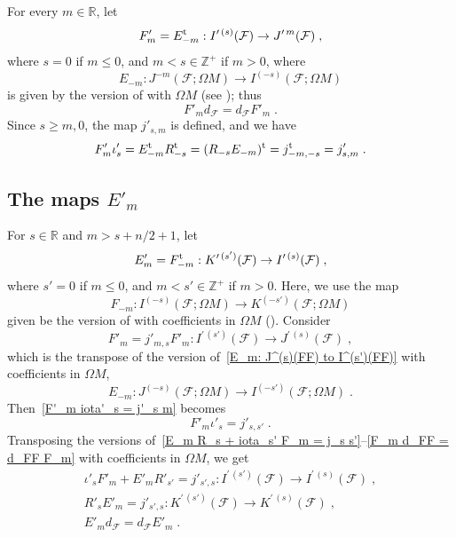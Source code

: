\documentclass{memo-l}
\theoremstyle{plain}
\theoremstyle{definition}
\theoremstyle{remark}
\newcommand{\R}{\mathbb{R}}
\newcommand{\Z}{\mathbb{Z}}
\newcommand{\FF}{\mathcal{F}}
\newcommand{\trans}{{\text{\rm t}}}
\numberwithin{section}{chapter}
\numberwithin{equation}{section}%
\begin{document}
For every $m\in\R$, let 
\[
F'_m=E_{-m}^\trans:I^{\prime\,(s)}(\FF)\to J^{\prime\,m}(\FF)\;,
\]
where $s=0$ if $m\le0$, and $m<s\in\Z^+$ if $m>0$, where
\[
E_{-m}:J^{-m}(\FF;\Omega M)\to I^{(-s)}(\FF;\Omega M)
\]
is given by the version of  with $\Omega M$ (see ); thus
\begin{equation}\label{F'_m d_FF = d_FF F'_m}
F'_md_\FF=d_\FF F'_m\;.
\end{equation}
Since $s\ge m,0$, the map $j'_{s,m}$ is defined, and we have
\begin{equation}\label{F'_m iota'_s = j'_s m}
F'_m\iota'_s=E_{-m}^\trans R_{-s}^\trans=(R_{-s}E_{-m})^\trans=j_{-m,-s}^\trans=j'_{s,m}\;.
\end{equation}




\subsection{The maps $E'_m$}\label{ss: E'_m}

For $s\in\R$ and $m>s+n/2+1$, let 
\[
E'_m=F_{-m}^\trans:K^{\prime\,(s')}(\FF)\to I^{\prime\,(s)}(\FF)\;,
\]
where $s'=0$ if $m\le0$, and $m<s'\in\Z^+$ if $m>0$. Here, we use the map
\[
F_{-m}:I^{(-s)}(\FF;\Omega M)\to K^{(-s')}(\FF;\Omega M)
\]
given be the version of  with coefficients in $\Omega M$ (). Consider
\begin{equation}\label{F'_m: I^prime (s')(FF) to J^prime (s)(FF)}
F'_m=j'_{m,s}F'_m:I^{\prime\,(s')}(\FF)\to J^{\prime\,(s)}(\FF)\;,
\end{equation}
which is the transpose of the version of~\eqref{E_m: J^(s)(FF) to I^(s')(FF)} with coefficients in $\Omega M$,
\[
E_{-m}:J^{(-s)}(\FF;\Omega M)\to I^{(-s')}(\FF;\Omega M)\;.
\]
Then~\eqref{F'_m iota'_s = j'_s m} becomes
\begin{equation}\label{F'_m iota'_s = j'_s s'}
F'_m\iota'_s=j'_{s,s'}\;.
\end{equation}
Transposing the versions of~\eqref{E_m R_s + iota_s' F_m = j_s s'}--\eqref{F_m d_FF = d_FF F_m} with coefficients in $\Omega M$, we get
\begin{gather}
\iota'_sF'_m+E'_mR'_{s'}=j'_{s',s}:I^{\prime\,(s')}(\FF)\to I^{\prime\,(s)}(\FF)\;,\label{iota'_s' F'_m + E'_m R'_s = j'_s' s}\\
R'_sE'_m=j'_{s',s}:K^{\prime\,(s')}(\FF)\to K^{\prime\,(s)}(\FF)\;,\label{R'_s E'_m = j'_s' s}\\
E'_m d_\FF=d_\FF E'_m\;.\label{E'_m d_FF = d_FF E'_m}
\end{gather}
\end{document}
